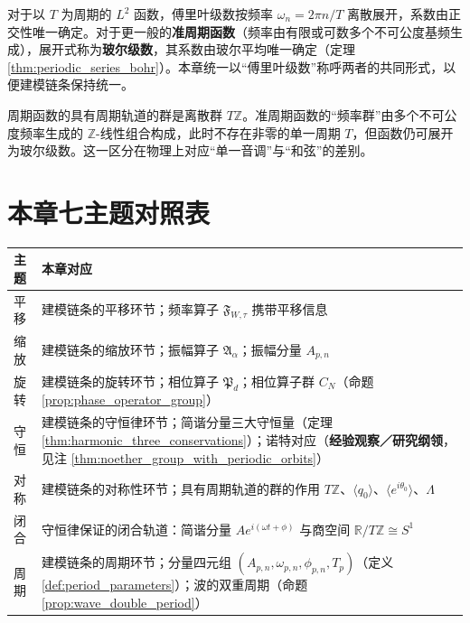 \begin{remark}[傅里叶级数与玻尔级数的区别]\label{rem:fourier_bohr_distinction}
对于以 $T$ 为周期的 $L^2$ 函数，傅里叶级数按频率 $\omega_n=2\pi n/T$ 离散展开，系数由正交性唯一确定。对于更一般的\textbf{准周期函数}（频率由有限或可数多个不可公度基频生成），展开式称为\textbf{玻尔级数}，其系数由玻尔平均唯一确定（定理 \ref{thm:periodic_series_bohr}）。本章统一以“傅里叶级数”称呼两者的共同形式，以便建模链条保持统一。
\end{remark}

\begin{remark}[周期函数与准周期函数]\label{rem:periodic_quasiperiodic}
周期函数的具有周期轨道的群是离散群 $T\mathbb{Z}$。准周期函数的“频率群”由多个不可公度频率生成的 $\mathbb{Z}$-线性组合构成，此时不存在非零的单一周期 $T$，但函数仍可展开为玻尔级数。这一区分在物理上对应“单一音调”与“和弦”的差别。
\end{remark}

\section*{本章七主题对照表}

\begin{center}
\renewcommand{\arraystretch}{1.3}
\begin{tabular}{>{\centering\arraybackslash}p{2.2cm}>{\centering\arraybackslash}p{10.5cm}}
\toprule
主题 & 本章对应 \\
\midrule
平移 & 建模链条的平移环节；频率算子 $\mathfrak{F}_{W,\tau}$ 携带平移信息 \\
缩放 & 建模链条的缩放环节；振幅算子 $\mathfrak{A}_\alpha$；振幅分量 $A_{p,n}$ \\
旋转 & 建模链条的旋转环节；相位算子 $\mathfrak{P}_d$；相位算子群 $C_N$（命题 \ref{prop:phase_operator_group}） \\
守恒 & 建模链条的守恒律环节；简谐分量三大守恒量（定理 \ref{thm:harmonic_three_conservations}）；诺特对应（\textbf{经验观察／研究纲领}，见注 \ref{thm:noether_group_with_periodic_orbits}） \\
对称 & 建模链条的对称性环节；具有周期轨道的群的作用 $T\mathbb{Z}$、$\langle q_0\rangle$、$\langle e^{i\theta_0}\rangle$、$\Lambda$ \\
闭合 & 守恒律保证的闭合轨道：简谐分量 $Ae^{i(\omega t+\phi)}$ 与商空间 $\mathbb{R}/T\mathbb{Z}\cong S^1$ \\
周期 & 建模链条的周期环节；分量四元组 $(A_{p,n}, \omega_{p,n}, \phi_{p,n}, T_p)$（定义 \ref{def:period_parameters}）；波的双重周期（命题 \ref{prop:wave_double_period}） \\
\bottomrule
\end{tabular}
\end{center}

